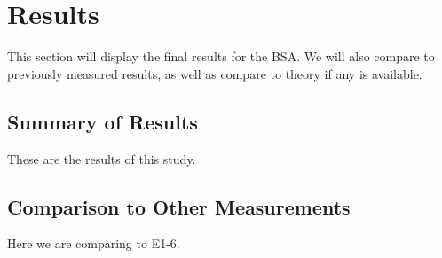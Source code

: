 \section{Results}
This section will display the final results for the BSA.  We will also compare to previously measured results, as well as compare to theory if any is available.


\subsection{Summary of Results}

These are the results of this study.

\subsection{Comparison to Other Measurements}

Here we are comparing to E1-6.
